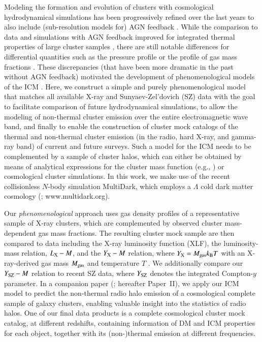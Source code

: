 \documentclass[useAMS,usenatbib]{mn2e}
\begin{document}
{  Modeling the formation and evolution of clusters with cosmological
  hydrodynamical simulations has been progressively refined over the last years
  to also include (sub-resolution models for) AGN feedback
  \citep[e.g.,][]{2007MNRAS.380..877S, 2008MNRAS.387.1403S, 2008ApJ...687L..53P,
    2012MNRAS.420.2662D, 2012MNRAS.424..190G, 2013MNRAS.428.2366V}. While the
  comparison to data and simulations with AGN feedback improved for integrated
  thermal properties of large cluster samples
  \citep{2012ApJ...758...74B,2012ApJ...758...75B}, there are still notable
  differences for differential quantities such as the pressure profile
  \citep{2013A&A...550A.131P} or the profile of gas mass fractions
  \citep{2012arXiv1209.4082B}. These discrepancies (that have been more dramatic
  in the past without AGN feedback) motivated the development of
  phenomenological models of the ICM \citep[e.g.,][]{2005ApJ...634..964O,
    2012MNRAS.422..686C}. Here, we construct a simple and purely
  phenomenological model that matches all available X-ray and Sunyaev-Zel'dovich
  (SZ) data with the goal to facilitate comparison of future hydrodynamical
  simulations, to allow the modeling of non-thermal cluster emission over the
  entire electromagnetic wave band, and finally to enable the construction of
  cluster mock catalogs of the thermal and non-thermal cluster emission (in the
  radio, hard X-ray, and gamma-ray band) of current and future surveys. Such a
  model for the ICM needs to be complemented by a sample of cluster halos, which
  can either be obtained by means of analytical expressions for the cluster mass
  function (e.g., \citealp{2001MNRAS.321..372J}) or cosmological cluster
  simulations. In this work, we make use of the recent collisionless $N$-body
  simulation MultiDark, which employs a $\Lambda$ cold dark matter cosmology
  (\citealp{2011arXiv1104.5130P}; www.multidark.org).

  Our \emph{phenomenological} approach uses gas density profiles of a
  representative sample of X-ray clusters, which are complemented by observed
  cluster mass-dependent gas mass fractions. The resulting cluster mock sample
  are then compared to data including the X-ray luminosity function (XLF), the
  luminosity-mass relation, $L_{{\mathrm{X}}}- M$, and the $Y_{{\mathrm{X}}}-M$ relation,
  where $Y_{{\mathrm{X}}}=M_{\mathrm{gas}}k_{{\mathrm{B}}}T$ with an X-ray-derived gas mass
  $M_{{\mathrm{gas}}}$ and temperature $T$ \citep{2006ApJ...650..128K}. We
  additionally compare our $Y_{{\mathrm{SZ}}}-M$ relation to recent SZ data, where
  $Y_{\mathrm{SZ}}$ denotes the integrated Compton-$y$ parameter.  In a companion
  paper (\citealp{paper2}; hereafter Paper~II), we apply our ICM model to
  predict the non-thermal radio halo emission of a cosmological complete sample of
  galaxy clusters, enabling valuable insight into the statistics of radio halos.
  One of our final data products is a complete cosmological cluster mock catalog,
  at different redshifts, containing information of DM and ICM properties for
  each object, together with its (non-)thermal emission at different
  frequencies. 

}
\end{document}
